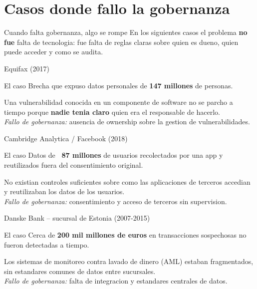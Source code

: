 \documentclass[aspectratio=169]{beamer}
\begin{document}
\section{Casos donde fallo la gobernanza}

\begin{frame}{Cuando falta gobernanza, algo se rompe}
  En los siguientes casos el problema \textbf{no fue} falta de tecnologia:
  fue falta de reglas claras sobre quien es dueno, quien puede acceder y como
  se audita.
\end{frame}

\begin{frame}{Equifax (2017)}
  \begin{block}{El caso}
    Brecha que expuso datos personales de \textbf{147 millones} de personas.
  \end{block}
  Una vulnerabilidad conocida en un componente de software no se parcho a
  tiempo porque \textbf{nadie tenia claro} quien era el responsable de
  hacerlo.
  \vspace{0.2em}\\
  \textit{Fallo de gobernanza:} ausencia de ownership sobre la gestion de
  vulnerabilidades.
\end{frame}

\begin{frame}{Cambridge Analytica / Facebook (2018)}
  \begin{block}{El caso}
    Datos de \textbf{~87 millones} de usuarios recolectados por una app y
    reutilizados fuera del consentimiento original.
  \end{block}
  No existian controles suficientes sobre como las aplicaciones de terceros
  accedian y reutilizaban los datos de los usuarios.
  \vspace{0.2em}\\
  \textit{Fallo de gobernanza:} consentimiento y acceso de terceros sin
  supervision.
\end{frame}

\begin{frame}{Danske Bank -- sucursal de Estonia (2007-2015)}
  \begin{block}{El caso}
    Cerca de \textbf{200 mil millones de euros} en transacciones sospechosas
    no fueron detectadas a tiempo.
  \end{block}
  Los sistemas de monitoreo contra lavado de dinero (AML) estaban
  fragmentados, sin estandares comunes de datos entre sucursales.
  \vspace{0.2em}\\
  \textit{Fallo de gobernanza:} falta de integracion y estandares centrales
  de datos.
\end{frame}
\end{document}
